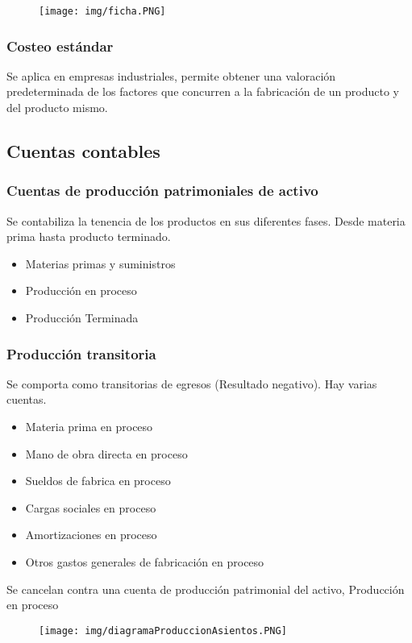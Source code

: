 \documentclass[titlepage,a4paper]{article}
\begin{document}
\begin{figure}[!htb]
    \centering
    \texttt{[image: img/ficha.PNG]}
\end{figure}


\subsubsection*{Costeo estándar}
Se aplica en empresas industriales, permite obtener una valoración predeterminada de los factores que concurren a la fabricación de un producto y del producto mismo.

\subsection*{Cuentas contables}
\subsubsection*{Cuentas de producción patrimoniales de activo}
Se contabiliza la tenencia de los productos en sus diferentes fases. Desde materia prima hasta producto terminado.
\begin{itemize}
\item Materias primas y suministros
\item Producción en proceso
\item Producción Terminada
\end{itemize}


\subsubsection*{Producción transitoria }
Se comporta como transitorias de egresos (Resultado negativo). Hay varias cuentas.
\begin{itemize}
\item Materia prima en proceso
\item Mano de obra directa en proceso
\item Sueldos de fabrica en proceso
\item Cargas sociales en proceso
\item Amortizaciones en proceso
\item Otros gastos generales de fabricación en proceso
\end{itemize}
Se cancelan contra una cuenta de producción patrimonial del activo, Producción en proceso

\begin{figure}[!htb]
    \centering
    \texttt{[image: img/diagramaProduccionAsientos.PNG]}
\end{figure}
\end{document}
